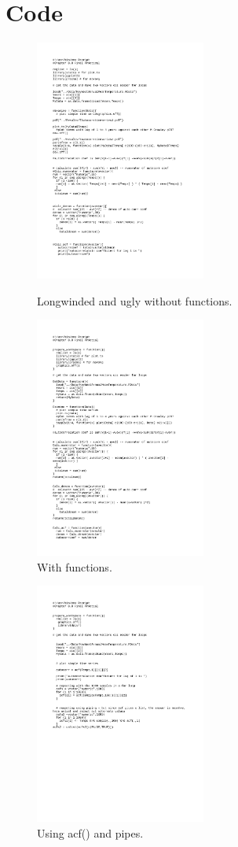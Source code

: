 \documentclass[a4paper]{article}
\begin{document}
\section{Code}


\begin{figure}
\centering
\includegraphics[width=0.5\textwidth]{TAutoCorr.pdf}
\caption{\label{fig:TAutoCorr.pdf}Longwinded and ugly without functions.}


\centering
\includegraphics[width=0.5\textwidth]{AutoCorr2.pdf}
\caption{\label{fig:AutoCorr2.pdf}With functions.}
\end{figure}

\begin{figure}
\centering
\includegraphics[width=0.5\textwidth]{AutoCorr3.pdf}
\caption{\label{fig:AutoCorr3.pdf} Using acf() and pipes.}

\end{figure}

\clearpage
\newpage
\mbox{~}
\clearpage
\newpage
\end{document}
